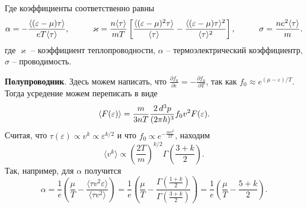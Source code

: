 Где коэффициенты соответственно равны
\begin{equation}
	\alpha = - \frac{\langle (\varepsilon-\mu) \tau \rangle}{e T \langle \tau\rangle},
	\hspace{10 mm} 
	\varkappa = \frac{n \langle \tau\rangle}{m T}\left[
		\frac{\langle (\varepsilon-\mu)^2 \tau\rangle}{\langle \tau\rangle} - \frac{\langle (\varepsilon-\mu) \tau\rangle^2}{\langle \tau\rangle^2}
	\right],
	\hspace{10 mm} 
	\sigma = \frac{n e^2 \langle \tau\rangle}{m}.
\end{equation}
где $\varkappa$ -- коэффициент теплопроводности, $\alpha$ -- термоэлектрический коэффициентр, $\sigma$ -- проводимость. 






\textbf{Полупроводник}. Здесь можем написать, что $\frac{\partial f_0}{\partial \varepsilon} = - \frac{\partial f_0}{\partial T}$, так как $f_0 \approx e^{(\mu-\varepsilon)/T}$. Тогда усредение можем переписать в виде
\begin{equation*}
	\langle F(\varepsilon)\rangle  = \frac{m}{3 n T} \frac{2 \, d^3 p}{(2 \pi \hbar)^3} f_0 v^2 F(\varepsilon).
\end{equation*}
Считая, что $\tau(\varepsilon) \propto v^k \propto \varepsilon^{k/2}$ и что $f_0 \propto e^{-\frac{m v^2}{2T}}$, находим
\begin{equation*}
	\langle v^k\rangle \propto \left(\frac{2 T}{m}\right)^{k/2} \Gamma\left(\frac{3+k}{2}\right).
\end{equation*}
Так, например, для $\alpha$ получится
\begin{equation*}
	\alpha = \frac{1}{e} \left(
		\frac{\mu}{T} - \frac{\langle \tau v^2 \varepsilon\rangle}{\langle  \tau v^2\rangle}
	\right) = \frac{1}{e} \left(
		\frac{\mu}{T} - \frac{\Gamma\left(\frac{1+k}{2}\right)}{\Gamma\left(\frac{3+k}{2}\right)}
	\right) = \frac{1}{e} \left(
		\frac{\mu}{T} - \frac{5+k}{2}
	\right).
\end{equation*}




% 